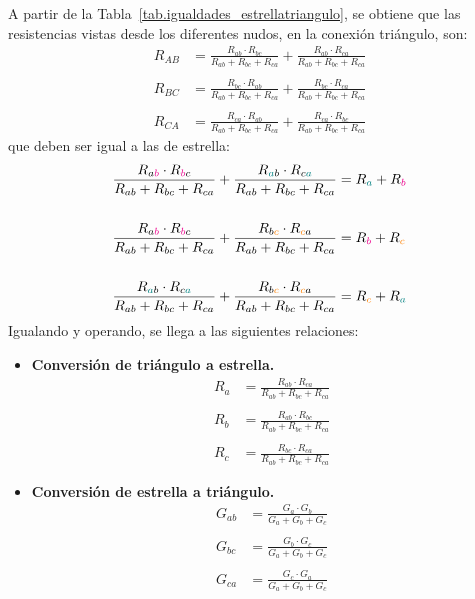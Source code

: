 \documentclass[11pt]{book} %
\numberwithin{dummy}{section}
\theoremstyle{ocrenumbox}
\theoremstyle{blacknumex}
\theoremstyle{blacknumbox}
\theoremstyle{ocrenum}
\begin{document}
	A partir de la Tabla~\ref{tab.igualdades_estrellatriangulo}, se obtiene que las resistencias vistas desde los diferentes nudos, en la conexión triángulo, son:
	\begin{align*}
		R_{AB} &= \frac{R_{ab} \cdot R_{bc}}{R_{ab} + R_{bc} + R_{ca}} + \frac{R_{ab} \cdot R_{ca}}{R_{ab} + R_{bc} + R_{ca}}\\
		\\
		R_{BC} &= \frac{R_{bc} \cdot R_{ab}}{R_{ab} + R_{bc} + R_{ca}} + \frac{R_{bc} \cdot R_{ca}}{R_{ab} + R_{bc} + R_{ca}}\\
		\\
		R_{CA} &= \frac{R_{ca} \cdot R_{ab}}{R_{ab} + R_{bc} + R_{ca}} + \frac{R_{ca} \cdot R_{bc}}{R_{ab} + R_{bc} + R_{ca}}
	\end{align*}
	que deben ser igual a las de estrella:
	\begin{align*}
		\dfrac{R_{a{\color{magenta}b}} \cdot R_{{\color{magenta}b}c}}{R_{ab} + R_{bc} + R_{ca}} + \dfrac{R_{{\color{teal}a}b} \cdot R_{c{\color{teal}a}}}{R_{ab} + R_{bc} + R_{ca}} &= R_{\color{teal}a} + R_{\color{magenta}b}\\
		\\
		\dfrac{R_{a{\color{magenta}b}} \cdot R_{{\color{magenta}b}c}}{R_{ab} + R_{bc} + R_{ca}} + \dfrac{R_{b{\color{orange}c}} \cdot R_{{\color{orange}c}a}}{R_{ab} + R_{bc} + R_{ca}} &= R_{\color{magenta}b} + R_{\color{orange}c}\\
		\\
		\dfrac{R_{{\color{teal}a}b} \cdot R_{c{\color{teal}a}}}{R_{ab} + R_{bc} + R_{ca}} + \dfrac{R_{b{\color{orange}c}} \cdot R_{{\color{orange}c}a}}{R_{ab} + R_{bc} + R_{ca}} &= R_{\color{orange}c} + R_{\color{teal}a}
	\end{align*}
	Igualando y operando, se llega a las siguientes relaciones: 
	\begin{itemize}
		\item \textbf{Conversión de triángulo a estrella.} 
		\begin{align*}
			R_a &= \frac{R_{ab} \cdot R_{ca}}{R_{ab} + R_{bc} + R_{ca}}\\
			\\
			R_b &= \frac{R_{ab} \cdot R_{bc}}{R_{ab} + R_{bc} + R_{ca}}\\
			\\
			R_c &= \frac{R_{bc} \cdot R_{ca}}{R_{ab} + R_{bc} + R_{ca}}
		\end{align*}
		\item \textbf{Conversión de estrella a triángulo.}
		\begin{align*}
			G_{ab} &= \frac{G_a \cdot G_b}{G_a + G_b + G_c}\\
			\\
			G_{bc} &= \frac{G_b \cdot G_c}{G_a + G_b + G_c}\\
			\\
			G_{ca} &= \frac{G_c \cdot G_a}{G_a + G_b + G_c}
		\end{align*}
	\end{itemize}
	
\end{document}

